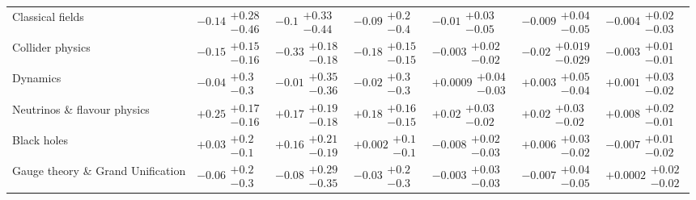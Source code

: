 \begin{table}[H]
\begin{tabular}{lllllll}
Classical fields & $-0.14\substack{+0.28 \\ -0.46}$ & $-0.1\substack{+0.33 \\ -0.44}$ & $-0.09\substack{+0.2 \\ -0.4}$ & $-0.01\substack{+0.03 \\ -0.05}$ & $-0.009\substack{+0.04 \\ -0.05}$ & $-0.004\substack{+0.02 \\ -0.03}$ \\
Collider physics & $\bm{-0.15}\substack{+0.15 \\ -0.16}$ & $\bm{-0.33}\substack{+0.18 \\ -0.18}$ & $\bm{-0.18}\substack{+0.15 \\ -0.15}$ & $-0.003\substack{+0.02 \\ -0.02}$ & $\bm{-0.02}\substack{+0.019 \\ -0.029}$ & $-0.003\substack{+0.01 \\ -0.01}$ \\
Dynamics & $-0.04\substack{+0.3 \\ -0.3}$ & $-0.01\substack{+0.35 \\ -0.36}$ & $-0.02\substack{+0.3 \\ -0.3}$ & $+0.0009\substack{+0.04 \\ -0.03}$ & $+0.003\substack{+0.05 \\ -0.04}$ & $+0.001\substack{+0.03 \\ -0.02}$ \\
Neutrinos \& flavour physics & $\bm{+0.25}\substack{+0.17 \\ -0.16}$ & $+0.17\substack{+0.19 \\ -0.18}$ & $\bm{+0.18}\substack{+0.16 \\ -0.15}$ & $\bm{+0.02}\substack{+0.03 \\ -0.02}$ & $+0.02\substack{+0.03 \\ -0.02}$ & $+0.008\substack{+0.02 \\ -0.01}$ \\
Black holes & $+0.03\substack{+0.2 \\ -0.1}$ & $+0.16\substack{+0.21 \\ -0.19}$ & $+0.002\substack{+0.1 \\ -0.1}$ & $-0.008\substack{+0.02 \\ -0.03}$ & $+0.006\substack{+0.03 \\ -0.02}$ & $-0.007\substack{+0.01 \\ -0.02}$ \\
Gauge theory \& Grand Unification & $-0.06\substack{+0.2 \\ -0.3}$ & $-0.08\substack{+0.29 \\ -0.35}$ & $-0.03\substack{+0.2 \\ -0.3}$ & $-0.003\substack{+0.03 \\ -0.03}$ & $-0.007\substack{+0.04 \\ -0.05}$ & $+0.0002\substack{+0.02 \\ -0.02}$ \\

\end{tabular}
\end{table}

